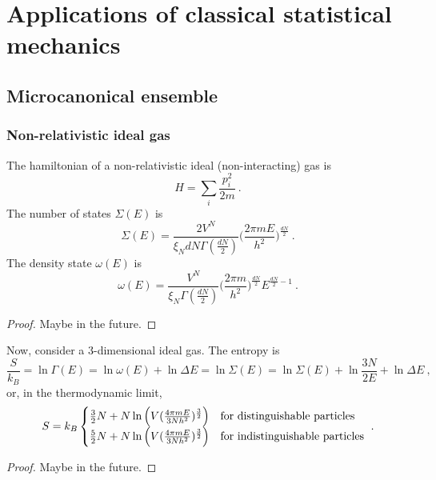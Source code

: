 \part{Applications of classical statistical mechanics}

\chapter{Microcanonical ensemble}

\section{Non-relativistic ideal gas}
    The hamiltonian of a non-relativistic ideal (non-interacting) gas is 
    \begin{equation*}
        H = \sum_i \frac{p^2_i}{2m} ~.
    \end{equation*}
    The number of states $\Sigma(E)$ is 
    \begin{equation*}
        \Sigma(E) = \frac{2V^{N}}{\xi_N d N \Gamma(\frac{dN}{2})} \Big ( \frac{2 \pi m E}{h^2}\Big)^{\frac{dN}{2}} ~.
    \end{equation*}
    The density state $\omega(E)$ is
    \begin{equation*}
        \omega (E) = \frac{V^N}{\xi_N \Gamma(\frac{dN}{2})} \Big ( \frac{2 \pi m}{h^2} \Big )^{\frac{dN}{2}} E^{\frac{dN}{2}-1} ~.
    \end{equation*}
    \begin{proof}
        Maybe in the future.
    \end{proof}

    Now, consider a $3$-dimensional ideal gas. The entropy is 
    \begin{equation*}
        \frac{S}{k_B} = \ln \Gamma(E) = \ln \omega(E) + \ln \Delta E = \ln \Sigma(E) = \ln \Sigma(E) + \ln \frac{3N}{2E} + \ln \Delta E ~,
    \end{equation*}
    or, in the thermodynamic limit, 
    \begin{equation*}
        S = k_B \begin{cases}
            \frac{3}{2} N + N \ln \Big ( V (\frac{4 \pi m E}{3 N h^2})^{\frac{3}{2}} \Big) & \textnormal{for distinguishable particles} \\
            \frac{5}{2} N + N \ln \Big ( V (\frac{4 \pi m E}{3 N h^2})^{\frac{3}{2}} \Big) & \textnormal{for indistinguishable particles} \\
        \end{cases} ~.
    \end{equation*}
    \begin{proof}
        Maybe in the future.
    \end{proof}
    
